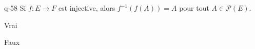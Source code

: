\begin{truefalse}{q-58}
Si $f:E\to F$ est injective, alors $f^{-1}(f(A))=A$ pour tout $A\in\mathcal{P}(E)$.
\item* Vrai
\item Faux
\end{truefalse}

